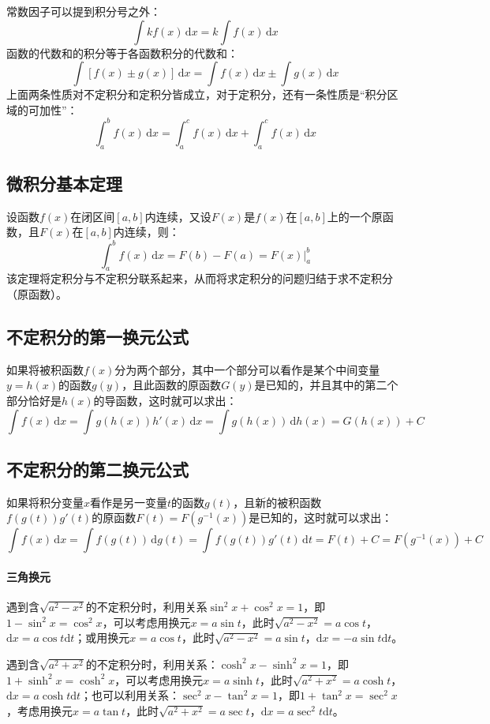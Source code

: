 \documentclass[fontset=none,openany,a4paper]{ctexbook}
\begin{document}
常数因子可以提到积分号之外：
\[
\int kf(x)\,\mathrm{d}x = k\int f(x)\,\mathrm{d}x
\]
函数的代数和的积分等于各函数积分的代数和：
\[
\int [f(x) \pm g(x)]\,\mathrm{d}x = \int f(x)\,\mathrm{d}x \pm \int g(x)\,\mathrm{d}x
\]
上面两条性质对不定积分和定积分皆成立，对于定积分，还有一条性质是“积分区域的可加性”：
\[
\int_a^b f(x)\,\mathrm{d}x = \int_a^c f(x)\,\mathrm{d}x + \int_a^c f(x)\,\mathrm{d}x
\]

\subsection{微积分基本定理}

设函数$f(x)$在闭区间$[a,b]$内连续，又设$F(x)$是$f(x)$在$[a,b]$上的一个原函数，且$F(x)$在$[a,b]$内连续，则：
\[
\int_a^b f(x)\,\mathrm{d}x = F(b) - F(a) = F(x)|_a^b
\]
该定理将定积分与不定积分联系起来，从而将求定积分的问题归结于求不定积分（原函数）。

\subsection{不定积分的第一换元公式}

如果将被积函数$f(x)$分为两个部分，其中一个部分可以看作是某个中间变量$y=h(x)$的函数$g(y)$，且此函数的原函数$G(y)$是已知的，并且其中的第二个部分恰好是$h(x)$的导函数，这时就可以求出：
\[
\int f(x)\,\mathrm{d}x = \int g(h(x))h'(x)\,\mathrm{d}x = \int g(h(x))\,\mathrm{d}h(x) = G(h(x))+C
\]

\subsection{不定积分的第二换元公式}

如果将积分变量$x$看作是另一变量$t$的函数$g(t)$，且新的被积函数$f(g(t))g'(t)$的原函数$F(t)=F(g^{-1}(x))$是已知的，这时就可以求出：
\[
\int f(x)\,\mathrm{d}x = \int f(g(t))\,\mathrm{d}g(t) = \int f(g(t))g'(t)\,\mathrm{d}t = F(t)+C = F(g^{-1}(x))+C
\]

\paragraph{三角换元}

遇到含$\sqrt{a^2-x^2}$的不定积分时，利用关系$\sin^2 x+\cos^2 x=1$，即$1-\sin^2 x=\cos^2 x$，可以考虑用换元$x=a\sin t$，此时$\sqrt{a^2-x^2}=a\cos t$，$\mathrm{d}x=a\cos t\mathrm{d}t$；或用换元$x=a\cos t$，此时$\sqrt{a^2-x^2}=a\sin t$，$\mathrm{d}x=-a\sin t\mathrm{d}t$。

遇到含$\sqrt{a^2+x^2}$的不定积分时，利用关系：$\cosh^2 x-\sinh^2 x=1$，即$1+\sinh^2 x=\cosh^2 x$，可以考虑用换元$x=a\sinh t$，此时$\sqrt{a^2+x^2}=a\cosh t$，$\mathrm{d}x=a\cosh t\mathrm{d}t$；也可以利用关系：$\sec^2 x-\tan^2 x=1$，即$1+\tan^2 x=\sec^2 x$，考虑用换元$x=a\tan t$，此时$\sqrt{a^2+x^2}=a\sec t$，$\mathrm{d}x=a\sec^2 t\mathrm{d}t$。
\end{document}
